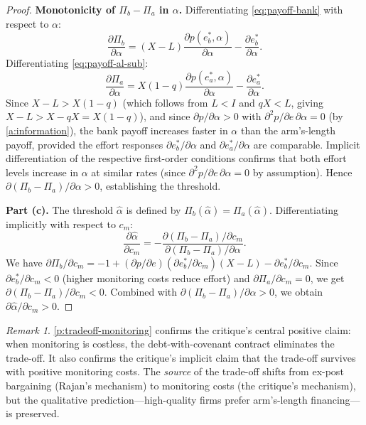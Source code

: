 \documentclass[12pt,a4paper]{article}
\theoremstyle{plain}
\theoremstyle{definition}
\theoremstyle{remark}
\newtheorem{remark}[theorem]{Remark}
\begin{document}
\begin{proof}
\textbf{Monotonicity of $\Pi_b - \Pi_a$ in $\alpha$.} Differentiating \cref{eq:payoff-bank} with respect to $\alpha$:
\begin{equation}
\label{eq:deriv-bank}
\frac{\partial \Pi_b}{\partial \alpha} = (X - L) \frac{\partial p(e_b^*, \alpha)}{\partial \alpha} - \frac{\partial e_b^*}{\partial \alpha}.
\end{equation}
Differentiating \cref{eq:payoff-al-sub}:
\begin{equation}
\label{eq:deriv-al}
\frac{\partial \Pi_a}{\partial \alpha} = X(1-q) \frac{\partial p(e_a^*, \alpha)}{\partial \alpha} - \frac{\partial e_a^*}{\partial \alpha}.
\end{equation}
Since $X - L > X(1-q)$ (which follows from $L < I$ and $qX < L$, giving $X - L > X - qX = X(1-q)$), and since $\partial p / \partial \alpha > 0$ with $\partial^2 p / \partial e \, \partial \alpha = 0$ (by \cref{a:information}), the bank payoff increases faster in $\alpha$ than the arm's-length payoff, provided the effort responses $\partial e_b^*/\partial \alpha$ and $\partial e_a^*/\partial \alpha$ are comparable. Implicit differentiation of the respective first-order conditions confirms that both effort levels increase in $\alpha$ at similar rates (since $\partial^2 p / \partial e \, \partial \alpha = 0$ by assumption). Hence $\partial(\Pi_b - \Pi_a)/\partial \alpha > 0$, establishing the threshold.

\textbf{Part (c).} The threshold $\hat{\alpha}$ is defined by $\Pi_b(\hat{\alpha}) = \Pi_a(\hat{\alpha})$. Differentiating implicitly with respect to $c_m$:
\begin{equation}
\label{eq:threshold-deriv}
\frac{\partial \hat{\alpha}}{\partial c_m} = -\frac{\partial(\Pi_b - \Pi_a)/\partial c_m}{\partial(\Pi_b - \Pi_a)/\partial \alpha}.
\end{equation}
We have $\partial \Pi_b / \partial c_m = -1 + (\partial p / \partial e)(\partial e_b^*/\partial c_m)(X - L) - \partial e_b^*/\partial c_m$. Since $\partial e_b^*/\partial c_m < 0$ (higher monitoring costs reduce effort) and $\partial \Pi_a / \partial c_m = 0$, we get $\partial(\Pi_b - \Pi_a)/\partial c_m < 0$. Combined with $\partial(\Pi_b - \Pi_a)/\partial \alpha > 0$, we obtain $\partial \hat{\alpha}/\partial c_m > 0$.
\end{proof}

\begin{remark}
\label{r:source-of-tradeoff}
\cref{p:tradeoff-monitoring} confirms the critique's central positive claim: when monitoring is costless, the debt-with-covenant contract eliminates the trade-off. It also confirms the critique's implicit claim that the trade-off survives with positive monitoring costs. The \emph{source} of the trade-off shifts from ex-post bargaining (Rajan's mechanism) to monitoring costs (the critique's mechanism), but the qualitative prediction---high-quality firms prefer arm's-length financing---is preserved.
\end{remark}
\end{document}
